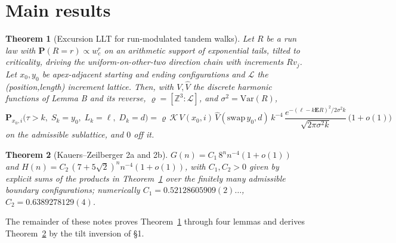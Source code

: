 \documentclass[11pt]{article}
\newtheorem{theorem}{Theorem}\newtheorem{lemma}{Lemma}\newtheorem{proposition}{Proposition}
\newcommand{\E}{\mathbf{E}}\newcommand{\Lat}{\mathcal{L}}\renewcommand{\Pr}{\mathbf{P}}
\begin{document}
\section{Main results}
\begin{theorem}[Excursion LLT for run-modulated tandem walks]\label{thm:main}
Let $R$ be a run law with $\Pr(R=r)\propto w_c^r$ on an arithmetic support of exponential
tails, tilted to criticality, driving the uniform-on-other-two direction chain with
increments $Rv_j$. Let $x_0,y_0$ be apex-adjacent starting and ending configurations and
$\Lat$ the (position,length) increment lattice. Then, with $V,\widehat V$ the discrete
harmonic functions of Lemma B and its reverse, $\varrho=[\mathbb{Z}^3:\Lat]$, and
$\sigma^2=\mathrm{Var}(R)$,
$$\Pr_{x_0,i}\big(\tau>k,\;S_k=y_0,\;L_k=\ell,\;D_k=d\big)
=\varrho\,\mathcal K\,V(x_0,i)\,\widehat V(\mathrm{swap}\,y_0,d)\,
k^{-4}\,\frac{e^{-(\ell-k\E R)^2/2\sigma^2k}}{\sqrt{2\pi\sigma^2k}}\,\big(1+o(1)\big)$$
on the admissible sublattice, and $0$ off it.
\end{theorem}
\begin{theorem}[Kauers--Zeilberger 2a and 2b]\label{thm:kz}
$G(n)=C_1\,8^n n^{-4}(1+o(1))$ and $H(n)=C_2\,(7+5\sqrt2)^n n^{-4}(1+o(1))$, with
$C_1,C_2>0$ given by explicit sums of the products in Theorem~\ref{thm:main} over the
finitely many admissible boundary configurations; numerically $C_1=0.52128605909(2)\ldots$,
$C_2=0.6389278129(4)$.
\end{theorem}
The remainder of these notes proves Theorem~\ref{thm:main} through four lemmas and derives
Theorem~\ref{thm:kz} by the tilt inversion of \S1.
\end{document}
